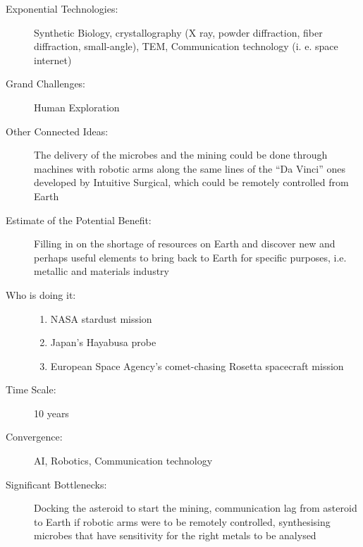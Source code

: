 \begin{description}
\item[Exponential Technologies:] Synthetic Biology, \Gls{crystallography} (X ray, powder diffraction, fiber diffraction, small-angle), \gls{TEM}, Communication technology (i. e. space internet)
\item[Grand Challenges:] Human Exploration
\item[Other Connected Ideas:] The delivery of the microbes and the mining could be done through machines with robotic arms along the same lines of the ``Da Vinci'' ones developed by Intuitive Surgical, which could be remotely controlled from Earth
\item[Estimate of the Potential Benefit:] Filling in on the shortage of resources on Earth and discover new and perhaps useful elements to bring back to Earth for specific purposes, i.e. metallic and materials industry
\item[Who is doing it:]
\hfill\begin{enumerate}
\item NASA stardust mission
\item Japan's Hayabusa probe
\item European Space Agency's comet-chasing Rosetta spacecraft mission
\end{enumerate}
\item[Time Scale:] 10 years
\item[Convergence:] AI, Robotics, Communication technology
\item[Significant Bottlenecks:] Docking the asteroid to start the mining, communication lag from asteroid to Earth if robotic arms were to be remotely controlled, synthesising microbes that have sensitivity for the right metals to be analysed
 \end{description}
 
